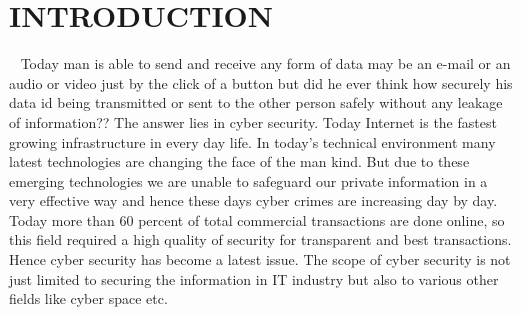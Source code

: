 \chapter{INTRODUCTION}\
\hspace*{0.3in}Today man is able to send and receive any form 
of data may be an e-mail or an audio or video 
just by the click of a button but did he ever 
think how securely his data id being transmitted 
or sent to the other person safely without any 
leakage of information?? The answer lies in 
cyber security. Today Internet is the fastest 
growing infrastructure in every day life. In 
today’s technical environment many latest 
technologies are changing the face of the man 
kind. But due to these emerging technologies 
we are unable to safeguard our private 
information in a very effective way and hence 
these days cyber crimes are increasing day by 
day. Today more than 60 percent of total 
commercial transactions are done online, so this 
field required a high quality of security for 
transparent and best transactions. Hence cyber 
security has become a latest issue. The scope of 
cyber security is not just limited to securing the 
information in IT industry but also to various 
other fields like cyber space etc.
\\

